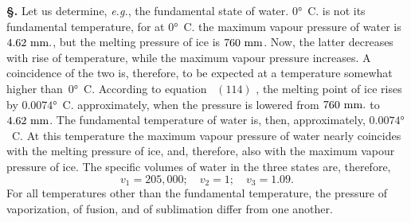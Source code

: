 \documentclass[12pt]{book}[2005/09/16]
\newcommand{\Section}[1]{
  \medskip\par\textbf{§\;#1}
  \label{section:#1}
}
\newcommand{\Eq}[1]{%
  \hyperref[eqn:#1]{\ensuremath{#1}}%
}
\newcommand{\PageSep}[1]{\ignorespaces}
\newcommand{\eg}{\emph{e.g.}}
\newcommand{\Unit}[1]{\text{\upshape #1}}
\begin{document}
\Section{187.} Let us determine, \eg, the fundamental state of
water. $0°$~C. is not its fundamental temperature, for at $0°$~C.
the maximum vapour pressure of water is $4.62~\Unit{mm.}$, but the
melting pressure of ice is $760~\Unit{mm}$. Now, the latter decreases
with rise of temperature, while the maximum vapour pressure
increases. A coincidence of the two is, therefore, to
be expected at a temperature somewhat higher than~$0°$~C\@.
According to equation~\Eq{(114)}, the melting point of ice rises
by $0.0074°$~C. approximately, when the pressure is lowered
from $760~\Unit{mm.}$ to $4.62~\Unit{mm}$. The fundamental temperature
of water is, then, approximately, $0.0074°$~C\@. At this
temperature the maximum vapour pressure of water nearly
coincides with the melting pressure of ice, and, therefore,
also with the maximum vapour pressure of ice. The
specific volumes of water in the three states are, therefore,
\[
v_{1} = 205,000;\quad
v_{2} = 1;\quad
v_{3} = 1.09.
\]
For all temperatures other than the fundamental temperature,
the pressure of vaporization, of fusion, and of
sublimation differ from one another.
\PageSep{155}
\end{document}
